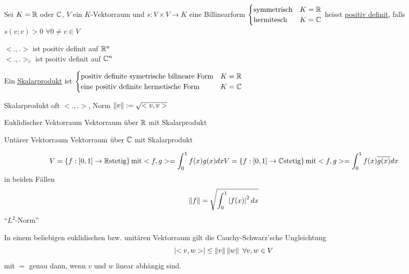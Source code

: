 \begin{Def}
  Sei $K=\mathbb{R}$ oder $\mathbb{C}$, $V$ ein $K$-Vektorraum und $s:V\times V\to K$ eine Billinearform $\begin{cases}
    \text{symmetrisch} & K= \mathbb{R} \\
    \text{hermitesch} & K=\mathbb{C}
  \end{cases}$
  heisst \underline{positiv definit}, falls $s(v;v)>0$ $\forall 0 \neq v\in V$
\end{Def}
\begin{Bsp}
  $<.,.>$ ist positiv definit auf $\mathbb{R}^n$\\
  $<.,.>_c$ ist psoitiv definit auf $\mathbb{C}^n$
\end{Bsp}
\begin{Def}
  Ein \underline{Skalarprodukt} ist $ \begin{cases}
    \text{positiv definite symetrische bilineare Form} & K=\mathbb{R}\\
    \text{eine positiv definite hermetische Form} & K=\mathbb{C}
  \end{cases}$ 
\end{Def}
\begin{Def}
  Skalarprodukt oft $<.,.>$, Norm $\left\| v \right\| := \sqrt{<v,v>}$
\end{Def}
\begin{Def}{Euklidischer Vektorraum}
  Vektorraum über $\mathbb{R}$ mit Skalarprodukt
\end{Def}
\begin{Def}{Untärer Vektorraum}
  Vektorraum über $\mathbb{C}$ mit Skalarprodukt
\end{Def}
\begin{Bsp}
  \begin{align*}
    V=\left\{ f:[0,1]\to\mathbb{R} \text{stetig} \right\} \text{mit} <f,g>=\int_0^1f(x)g(x)dx
    V=\left\{ f:[0,1]\to\mathbb{C} \text{stetig} \right\} \text{mit} <f,g>=\int_0^1f(x)\overline{g(x)}dx
  \end{align*}
  in beiden Fällen
  \[\left\| f \right\|=\sqrt{\int_0^1\left| f(x) \right|^2dx}\]
  ``$L^2$-Norm''
\end{Bsp}
\begin{Bem}
  In einem beliebigen euklidischen bzw. unitären Vektorraum gilt die Cauchy-Schwarz'sche Ungleichtung
  \[\left| <v,w> \right|\leq \left\| v \right\|\left\| w \right\|\ \forall v,w\in V\]
  mit $=$ genau dann, wenn $v$ und $w$ linear abhängig sind.
\end{Bem}
